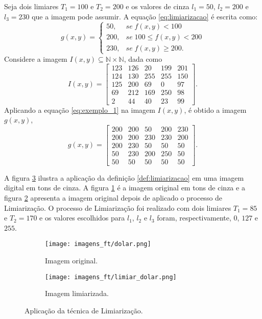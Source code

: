 \begin{exemplo}
	Seja dois limiares $T_1 = 100$ e $T_2 = 200$ e os valores de cinza $l_1 = 50$, $l_2 = 200$ e $l_3 = 230$ que a imagem pode assumir. A equação \ref{eq:limiarizacao} é escrita como:
	\begin{equation}
		g(x,y) =
		\begin{cases}
			50, & se \; f(x,y) < 100 \\
			200, & se \; 100 \leq f(x,y) < 200 \\
			230, & se \; f(x,y) \geq 200.
		\end{cases}
		\label{eq:exemplo_1}
	\end{equation}
	Considere a imagem $I(x,y) \subseteq \mathbb{N} \times \mathbb{N}$, dada como
	\begin{equation}
		I(x,y) = \begin{bmatrix}
			123 & 126 & 20 & 199 & 201 \\
			124 & 130 & 255 & 255 & 150 \\
			125 & 200 & 69 & 0 & 97 \\
			69 & 212 & 169 & 250 & 98 \\
			2 & 44 & 40 & 23 & 99
		\end{bmatrix}.
	\end{equation}
	Aplicando a equação \ref{eq:exemplo_1} na imagem $I(x,y)$, é obtido a imagem $g(x,y)$,
	\begin{equation}
		g(x,y) = \begin{bmatrix}
			200 & 200 & 50 & 200 & 230 \\
			200 & 200 & 230 & 230 & 200 \\
			200 & 230 & 50 & 50 & 50 \\
			50 & 230 & 200 & 250 & 50 \\
			50 & 50 & 50 & 50 & 50
		\end{bmatrix}.
	\end{equation}
\end{exemplo}

A figura \ref{fig:limiar} ilustra a aplicação da definição \ref{def:limiarizacao} em uma imagem digital em tons de cinza. A figura \ref{fig:dolar_original1} é a imagem original em tons de cinza e a figura \ref{fig:dolar_limiarizado} apresenta a imagem original depois de aplicado o processo de Limiarização. O processo de Limiarização foi realizado com dois limiares $T_1 = 85$ e $T_2 = 170$ e os valores escolhidos para $l_1$, $l_2$ e $l_3$ foram, respectivamente, $0$, $127$ e $255$. 

\begin{figure}[h]
	\centering
	\begin{subfigure}[b]{0.45\textwidth}
		\centering
		\texttt{[image: imagens\_ft/dolar.png]}
		\caption{Imagem original.}
		\label{fig:dolar_original1}
	\end{subfigure}
	\hfill
	\begin{subfigure}[b]{0.45\textwidth}
		\centering
		\texttt{[image: imagens\_ft/limiar\_dolar.png]}
		\caption{Imagem limiarizada.}
		\label{fig:dolar_limiarizado}
	\end{subfigure}
	\caption{Aplicação da técnica de Limiarização.}
	\label{fig:limiar}
\end{figure}

